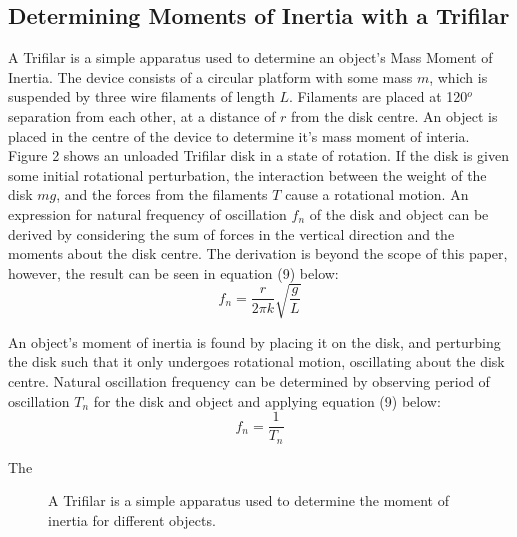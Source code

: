 \documentclass[a4paper]{article}
\begin{document}
\subsection{Determining Moments of Inertia with a Trifilar}

A Trifilar is a simple apparatus used to determine an object's Mass Moment of Inertia. The device consists of a circular platform with some mass $m$, which is suspended by three wire filaments of length $L$. Filaments are placed at 120$^o$ separation from each other, at a distance of $r$ from the disk centre. An object is placed in the centre of the device to determine it's mass moment of interia. Figure 2 shows an unloaded Trifilar disk in a state of rotation. If the disk is given some initial rotational perturbation, the interaction between the weight of the disk $mg$, and the forces from the filaments $T$ cause a rotational motion. An expression for natural frequency of oscillation $f_n$ of the disk and object can be derived by considering the sum of forces in the vertical direction and the moments about the disk centre. The derivation is beyond the scope of this paper, however, the result can be seen in equation (9) below:
\begin{equation}
f_n = \frac{r}{2 \pi k} \sqrt{\frac{g}{L}}
\end{equation}


An object's moment of inertia is found by placing it on the disk, and perturbing the disk such that it only undergoes rotational motion, oscillating about the disk centre. Natural oscillation frequency can be determined by observing period of oscillation $T_n$ for the disk and object and applying equation (9) below:
\begin{equation}
f_n = \frac{1}{T_n}
\end{equation}

The 

\begin{figure}[h]
	\centering
	\caption{A Trifilar is a simple apparatus used to determine the moment of inertia for different objects.}
\end{figure}
\end{document}
